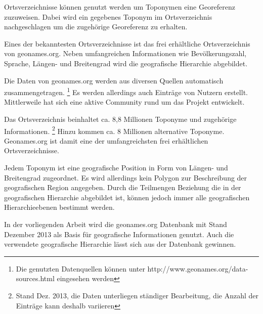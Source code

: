 			Ortsverzeichnisse können genutzt werden um Toponymen eine Georeferenz zuzuweisen. 
			Dabei wird ein gegebenes Toponym im Ortsverzeichnis nachgeschlagen um die zugehörige Georeferenz zu erhalten.  
		
			Eines der bekanntesten Ortsverzeichnisse ist das frei erhältliche Ortsverzeichnis von geonames.org. 
			Neben umfangreichen Informationen wie Bevölkerungszahl, Sprache, Längen- und Breitengrad wird die geografische Hierarchie abgebildet.

			Die Daten von geonames.org werden aus diversen Quellen automatisch zusammengetragen. \footnote{Die genutzten Datenquellen können unter http://www.geonames.org/data-sources.html eingesehen werden} 
			Es werden allerdings auch Einträge von Nutzern erstellt. 
			Mittlerweile hat sich eine aktive Community rund um das Projekt entwickelt. 

			Das Ortsverzeichnis beinhaltet ca. 8,8 Millionen Toponyme und zugehörige Informationen. \footnote{Stand Dez. 2013, die Daten unterliegen ständiger Bearbeitung, die Anzahl der Einträge kann deshalb variieren} 
			Hinzu kommen ca. 8 Millionen alternative Toponyme.
			Geonames.org ist damit eine der umfangreichsten frei erhältlichen Ortsverzeichnisse.

			Jedem Toponym ist eine geografische Position in Form von Längen- und Breitengrad zugeordnet. 
			Es wird allerdings kein Polygon zur Beschreibung der geografischen Region angegeben.
			Durch die Teilmengen Beziehung die in der geografischen Hierarchie abgebildet ist, können jedoch immer alle geografischen Hierarchieebenen bestimmt werden.

			In der vorliegenden Arbeit wird die geonames.org Datenbank mit Stand Dezember 2013 als Basis für geografische Informationen genutzt.
			Auch die verwendete geografische Hierarchie lässt sich aus der Datenbank gewinnen.

		

	

	
